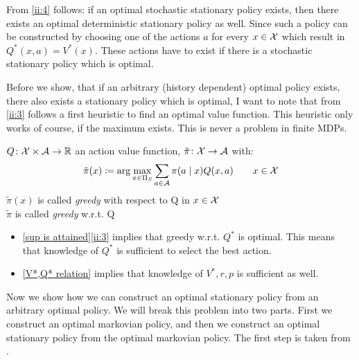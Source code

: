 \begin{remark}\label{opt stat => opt det stat}
	From \ref{ii:4} follows: if an optimal stochastic stationary policy exists, then there exists an optimal deterministic stationary policy as well. Since such a policy can be constructed by choosing one of the actions \(a\) for every \(x\in\mathcal{X}\) which result in \(Q^*(x,a)=V^*(x)\). These actions have to exist if there is a stochastic stationary policy which is optimal.
\end{remark}
	Before we show, that if an arbitrary (history dependent) optimal policy exists, there also exists a stationary policy which is optimal, I want to note that from \ref{ii:3} follows a first heuristic to find an optimal value function. This heuristic only works of course, if the maximum exists. This is never a problem in finite MDPs. 
\begin{definition}
	\(Q\colon\mathcal{X}\times\mathcal{A}\to\mathbb{R}\) an action value function, \(\tilde{\pi}\colon\mathcal{X}\to\mathcal{A}\) with:
	\[
	\tilde{\pi}(x)\coloneqq\arg\max_{\pi\in\Pi_S}\sum_{a\in\mathcal{A}}\pi(a\mid x) Q(x,a)\qquad x\in\mathcal{X}
	\]
	\(\tilde{\pi}(x)\) is called \emph{greedy} with respect to Q in \(x\in\mathcal{X}\)\\
	\(\tilde{\pi}\) is called \emph{greedy} w.r.t. Q
\end{definition}

\begin{remark}\leavevmode
	\begin{itemize}
	\item \ref{sup is attained}\ref{ii:3} implies that greedy w.r.t. \(Q^*\) is optimal. 
	This means that knowledge of \(Q^*\) is sufficient to select the best action.
	\item \ref{V*,Q* relation} implies that knowledge of \(V^*,r,p\) is sufficient as well.
	\end{itemize}
\end{remark}

Now we show how we can construct an optimal stationary policy from an arbitrary optimal policy. We will break this problem into two parts. First we construct an optimal markovian policy, and then we construct an optimal stationary policy from the optimal markovian policy. The first step is taken from \textcite[134-137]{putermanMarkovDecisionProcesses2005}.

